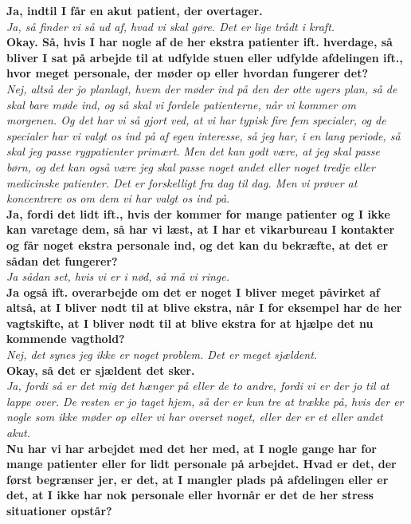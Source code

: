 \noindent
\textbf{Ja, indtil I får en akut patient, der overtager.}\\
\noindent
\textit{Ja, så finder vi så ud af, hvad vi skal gøre. Det er lige trådt i kraft.}\\
\noindent
\textbf{Okay. Så, hvis I har nogle af de her ekstra patienter ift. hverdage, så bliver I sat på arbejde til at udfylde stuen eller udfylde afdelingen ift., hvor meget personale, der møder op eller hvordan fungerer det?}\\
\noindent
\textit{Nej, altså der jo planlagt, hvem der møder ind på den der otte ugers plan, så de skal bare møde ind, og så skal vi fordele patienterne, når vi kommer om morgenen. Og det har vi så gjort ved, at vi har typisk fire fem specialer, og de specialer har vi valgt os ind på af egen interesse, så jeg har, i en lang periode, så skal jeg passe rygpatienter primært. Men det kan godt være, at jeg skal passe børn, og det kan også være jeg skal passe noget andet eller noget tredje eller medicinske patienter. Det er forskelligt fra dag til dag. Men vi prøver at koncentrere os om dem vi har valgt os ind på.}\\
\noindent
\textbf{Ja, fordi det lidt ift., hvis der kommer for mange patienter og I ikke kan varetage dem, så har vi læst, at I har et vikarbureau I kontakter og får noget ekstra personale ind, og det kan du bekræfte, at det er sådan det fungerer?} \\
\noindent
\textit{Ja sådan set, hvis vi er i nød, så må vi ringe.}\\
\noindent
\textbf{Ja også ift. overarbejde om det er noget I bliver meget påvirket af altså, at I bliver nødt til at blive ekstra, når I for eksempel har de her vagtskifte, at I bliver nødt til at blive ekstra for at hjælpe det nu kommende vagthold?}\\
\noindent
\textit{Nej, det synes jeg ikke er noget problem. Det er meget sjældent.}\\
\noindent
\textbf{Okay, så det er sjældent det sker.}\\
\noindent
\textit{Ja, fordi så er det mig det hænger på eller de to andre, fordi vi er der jo til at lappe over. De resten er jo taget hjem, så der er kun tre at trække på, hvis der er nogle som ikke møder op eller vi har overset noget, eller der er et eller andet akut.}\\
\noindent
\textbf{Nu har vi har arbejdet med det her med, at I nogle gange har for mange patienter eller for lidt personale på arbejdet. Hvad er det, der først begrænser jer, er det, at I mangler plads på afdelingen eller er det, at I ikke har nok personale eller hvornår er det de her stress situationer opstår?}\\
